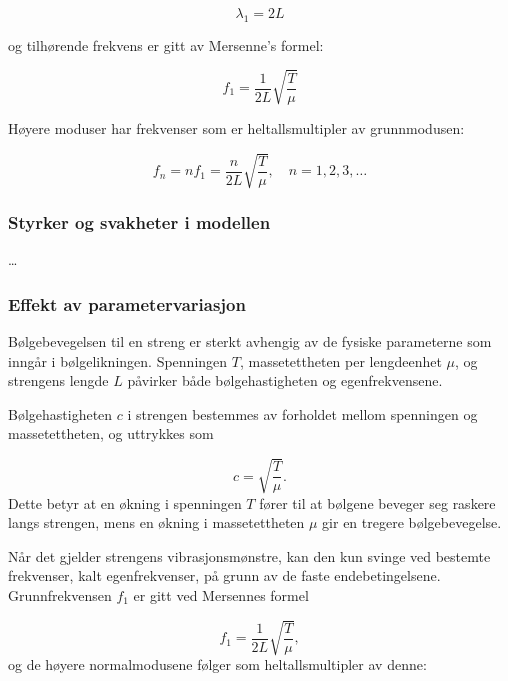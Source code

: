 \begin{equation*}
\lambda_1 = 2L
\end{equation*}

og tilhørende frekvens er gitt av Mersenne's formel:

\begin{equation*}
f_1 = \frac{1}{2L} \sqrt{\frac{T}{\mu}}
\end{equation*}

Høyere moduser har frekvenser som er heltallsmultipler av grunnmodusen:

\begin{equation*}
f_n = n f_1 = \frac{n}{2L} \sqrt{\frac{T}{\mu}}, \quad n = 1, 2, 3, \dots
\end{equation*}




\subsubsection{Styrker og svakheter i modellen}
\dots



\subsubsection{Effekt av parametervariasjon}

Bølgebevegelsen til en streng er sterkt avhengig av de fysiske parameterne som inngår i bølgelikningen. Spenningen \( T \), massetettheten per lengdeenhet \( \mu \), og strengens lengde \( L \) påvirker både bølgehastigheten og egenfrekvensene.

Bølgehastigheten \( c \) i strengen bestemmes av forholdet mellom spenningen og massetettheten, og uttrykkes som

\begin{equation*}
c = \sqrt{\frac{T}{\mu}}.
\end{equation*}
Dette betyr at en økning i spenningen \( T \) fører til at bølgene beveger seg raskere langs strengen, mens en økning i massetettheten \( \mu \) gir en tregere bølgebevegelse. 

Når det gjelder strengens vibrasjonsmønstre, kan den kun svinge ved bestemte frekvenser, kalt egenfrekvenser, på grunn av de faste endebetingelsene. Grunnfrekvensen \( f_1 \) er gitt ved Mersennes formel

\begin{equation*}
f_1 = \frac{1}{2L} \sqrt{\frac{T}{\mu}},
\end{equation*}
og de høyere normalmodusene følger som heltallsmultipler av denne:

